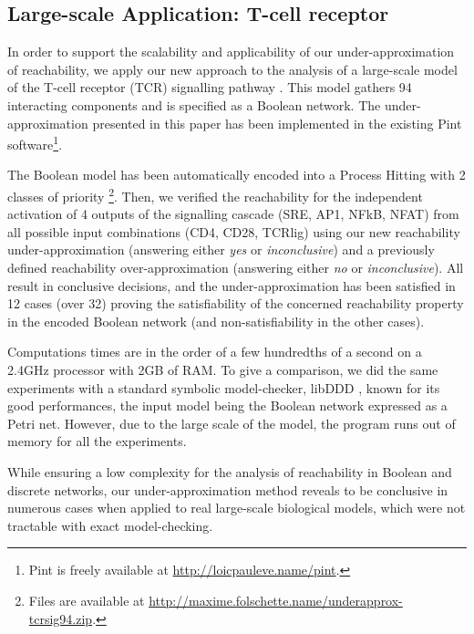 \subsection{Large-scale Application: T-cell receptor}
\label{ssec:ex-tcrsig}

In order to support the scalability and applicability of our under-approximation of reachability, we
apply our new approach to the analysis of a large-scale model of the T-cell receptor (TCR)
signalling pathway \cite{tcrsig94}.
This model gathers 94 interacting components and is specified as a Boolean network.
The under-approximation presented in this paper has been implemented in the existing Pint
software\footnote{Pint is freely available at \url{http://loicpauleve.name/pint}.}.

The Boolean model has been automatically encoded into a Process Hitting with 2 classes of priority%
\footnote{Files are available at
\url{http://maxime.folschette.name/underapprox-tcrsig94.zip}.}.
Then, we verified the reachability for the independent activation of 4 outputs of the signalling
cascade (SRE, AP1, NFkB, NFAT) from all possible input combinations (CD4, CD28, TCRlig) using our
new reachability under-approximation (answering either \emph{yes} or \emph{inconclusive}) and a 
previously defined reachability over-approximation \cite{PMR12-MSCS} (answering either \emph{no} or
\emph{inconclusive}).
All result in conclusive decisions, and the under-approximation has been satisfied in 12 cases (over
32) proving the satisfiability of the concerned reachability property in the encoded Boolean network
(and non-satisfiability in the other cases).

Computations times are in the order of a few hundredths of a second on a 2.4GHz processor with 2GB
of RAM.
To give a comparison, we did the same experiments with a standard symbolic model-checker, libDDD
\cite{libddd}, known for its good performances, the input model being the Boolean network expressed
as a Petri net.
However, due to the large scale of the model, the program runs out of memory for all the experiments.

While ensuring a low complexity for the analysis of reachability in Boolean and discrete networks, our
under-approximation method reveals to be conclusive in numerous cases when applied to real
large-scale biological models, which were not tractable with exact model-checking.

